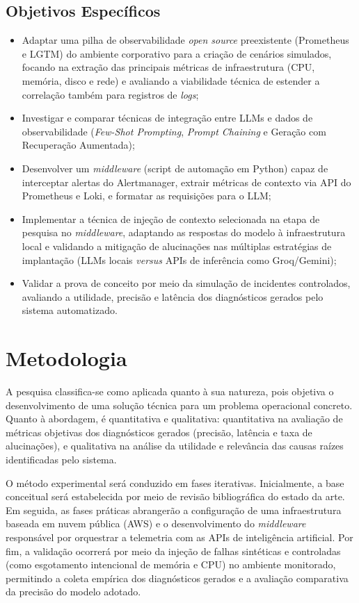 \subsection{Objetivos Específicos}
\begin{itemize}
    \item Adaptar uma pilha de observabilidade \emph{open source} preexistente (Prometheus e LGTM) do ambiente corporativo para a criação de cenários simulados, focando na extração das principais métricas de infraestrutura (CPU, memória, disco e rede) e avaliando a viabilidade técnica de estender a correlação também para registros de \emph{logs};
    \item Investigar e comparar técnicas de integração entre LLMs e dados de observabilidade (\emph{Few-Shot Prompting}, \emph{Prompt Chaining} e Geração com Recuperação Aumentada);
    \item Desenvolver um \emph{middleware} (script de automação em Python) capaz de interceptar alertas do Alertmanager, extrair métricas de contexto via API do Prometheus e Loki, e formatar as requisições para o LLM;
    \item Implementar a técnica de injeção de contexto selecionada na etapa de pesquisa no \emph{middleware}, adaptando as respostas do modelo à infraestrutura local e validando a mitigação de alucinações nas múltiplas estratégias de implantação (LLMs locais \emph{versus} APIs de inferência como Groq/Gemini);
    \item Validar a prova de conceito por meio da simulação de incidentes controlados, avaliando a utilidade, precisão e latência dos diagnósticos gerados pelo sistema automatizado.
\end{itemize}

\section{Metodologia}
A pesquisa classifica-se como aplicada quanto à sua natureza, pois objetiva o desenvolvimento de uma solução técnica para um problema operacional concreto. Quanto à abordagem, é quantitativa e qualitativa: quantitativa na avaliação de métricas objetivas dos diagnósticos gerados (precisão, latência e taxa de alucinações), e qualitativa na análise da utilidade e relevância das causas raízes identificadas pelo sistema.

O método experimental será conduzido em fases iterativas. Inicialmente, a base conceitual será estabelecida por meio de revisão bibliográfica do estado da arte. Em seguida, as fases práticas abrangerão a configuração de uma infraestrutura baseada em nuvem pública (AWS) e o desenvolvimento do \textit{middleware} responsável por orquestrar a telemetria com as APIs de inteligência artificial. Por fim, a validação ocorrerá por meio da injeção de falhas sintéticas e controladas (como esgotamento intencional de memória e CPU) no ambiente monitorado, permitindo a coleta empírica dos diagnósticos gerados e a avaliação comparativa da precisão do modelo adotado.

